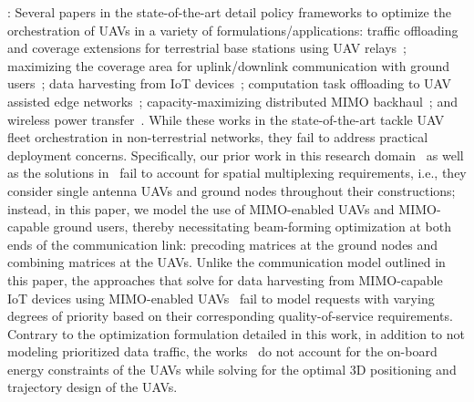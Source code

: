 \documentclass[10pt, twocolumn]{IEEEtran}
\begin{document}
: Several papers in the state-of-the-art detail policy frameworks to optimize the orchestration of UAVs in a variety of formulations/applications: traffic offloading and coverage extensions for terrestrial base stations using UAV relays~\cite{MAESTRO_TCCN}; maximizing the coverage area for uplink/downlink communication with ground users~\cite{Core_SoA_1_Ref_13, Core_SoA_1_Ref_14}; data harvesting from IoT devices~\cite{Core_SoA_1_Ref_12, Core_SoA_1_Ref_18_Extended_From_17, Core_SoA_1_Ref_25}; computation task offloading to UAV assisted edge networks~\cite{Core_SoA_1, Core_SoA_1_Ref_24}; capacity-maximizing distributed MIMO backhaul~\cite{CORES_ICASSP, CORES_JSAC}; and wireless power transfer~\cite{Core_SoA_1_Ref_27_Related_To_26}. While these works in the state-of-the-art tackle UAV fleet orchestration in non-terrestrial networks, they fail to address practical deployment concerns. Specifically, our prior work in this research domain~\cite{MAESTRO_TCCN} as well as the solutions in~\cite{Core_SoA_1_Ref_13, Core_SoA_1_Ref_14} fail to account for spatial multiplexing requirements, i.e., they consider single antenna UAVs and ground nodes throughout their constructions; instead, in this paper, we model the use of MIMO-enabled UAVs and MIMO-capable ground users, thereby necessitating beam-forming optimization at both ends of the communication link: precoding matrices at the ground nodes and combining matrices at the UAVs. Unlike the communication model outlined in this paper, the approaches that solve for data harvesting from MIMO-capable IoT devices using MIMO-enabled UAVs~\cite{Core_SoA_1_Ref_12, Core_SoA_1_Ref_18_Extended_From_17, Core_SoA_1_Ref_25} fail to model requests with varying degrees of priority based on their corresponding quality-of-service requirements. Contrary to the optimization formulation detailed in this work, in addition to not modeling prioritized data traffic, the works~\cite{Core_SoA_1, Core_SoA_1_Ref_24, CORES_ICASSP, CORES_JSAC, Core_SoA_1_Ref_27_Related_To_26} do not account for the on-board energy constraints of the UAVs while solving for the optimal $3$D positioning and trajectory design of the UAVs.\\
\end{document}
